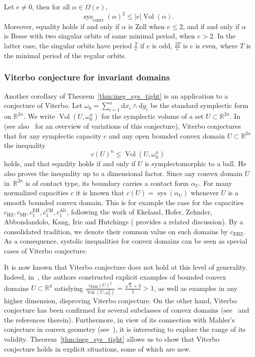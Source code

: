 \documentclass[AHL,Unicode,longabstracts]{cedram}
\DeclareMathOperator{\vol}{Vol}
\DeclareMathOperator{\sys}{sys}
\DeclareMathOperator{\contr}{contr}
\DeclareMathOperator{\SH}{SH}
\DeclareMathOperator{\EH}{EH}
\DeclareMathOperator{\HZ}{HZ}
\DeclareMathOperator{\EHZ}{EHZ}
\DeclareMathOperator{\CH}{CH}
\DeclareMathOperator{\Alt}{Alt}
\newcommand{\bbR}{\mathbb{R}}
\newcommand{\rmd}{\mathrm{d}}
\begin{document}
\begin{coro}\label{coro:sys_contr}
Let $e \neq 0$, then for all $\alpha \in \Omega(e)$,
\[
\sys_{\contr}(\alpha)^2 \leq |e| \vol(\alpha).
\]
Moreover, equality holds if and only if $\alpha$ is Zoll when $e \leq 2$, and if and only if $\alpha$ is Besse with two singular orbits of same minimal period, when $e>2$. In the latter case, the singular orbits have period $\frac{T}{e}$ if $e$ is odd, $\frac{2T}{e}$ is $e$ is even, where $T$ is the minimal period of the regular orbits.
\end{coro}



\subsubsection{Viterbo conjecture for invariant domains}\label{ssub:viterbo}
Another corollary of Theorem~\ref{thm:ineg_sys_tight} is an application to a conjecture of Viterbo. Let $\omega_0 = \sum_{i=1}^n \rmd x_i \wedge \rmd y_i$ be the standard symplectic form on $\bbR^{2n}$. We write $\vol(U, \omega_0^n)$ for the symplectic volume of a set $U \subset \bbR^{2n}$. In~\cite{Viterbo_2000} (see also~\cite{MR4413022} for an overview of variations of this conjecture), Viterbo conjectures that for any symplectic capacity $c$ and any open bounded convex domain $U \subset \bbR^{2n}$ the inequality
\begin{equation}\label{eq:conj_viterbo}
c(U)^n \leq \vol(U, \omega_0^n)
\end{equation}
holds, and that equality holds if and only if $U$ is symplectomorphic to a ball. He also proves the inequality up to a dimensional factor. Since any convex domain $U$ in~$\bbR^{2n}$ is of contact type, its boundary carries a contact form $\alpha_U$. For many normalized capacities $c$ it is known that $c(U)=\sys(\alpha_U)$ whenever $U$ is a smooth bounded convex domain. This is for example the case for the capacities $c_{\HZ}, c_{\SH}, c_1^{\EH}, c_1^{\CH}, c_1^{\Alt}$, following the work of Ekeland, Hofer, Zehnder, Abbondandolo, Kang, Irie and Hutchings (\cite{hryniewicz2023hopf} provides a related discussion). By a consolidated tradition, we denote their common value on such domains by $c_{\EHZ}$. As a consequence, systolic inequalities for convex domains can be seen as special cases of Viterbo conjecture.

It is now known that Viterbo conjecture does not hold at this level of generality. Indeed, in~\cite{haimkislev2024counterexample}, the authors constructed explicit examples of bounded convex domains $U \subset \bbR^4$ satisfying $\frac{c_{\EHZ}(U)^2}{\vol(U, \omega_0^2)} = \frac{\sqrt{5}+3}{5} > 1$, as well as examples in any higher dimension, disproving Viterbo conjecture. On the other hand, Viterbo conjecture has been confirmed for several subclasses of convex domains (see~\cite{haimkislev2024counterexample} and the references therein). Furthermore, in view of its connection with Mahler's conjecture in convex geometry (see~\cite{10.1215/00127094-2794999}), it is interesting to explore the range of its validity. Theorem~\ref{thm:ineg_sys_tight} allows us to show that Viterbo conjecture holds in explicit situations, some of which are new.
\end{document}
